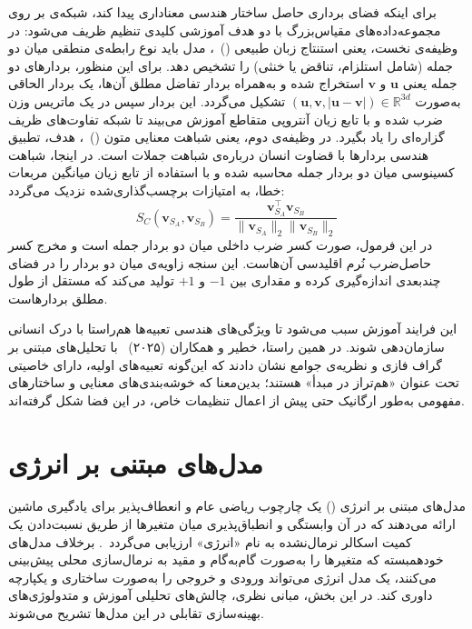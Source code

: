 برای اینکه فضای برداری حاصل ساختار هندسی معناداری پیدا کند، شبکه‌ی  بر روی مجموعه‌داده‌های مقیاس‌بزرگ با دو هدف آموزشی کلیدی تنظیم ظریف می‌شود: در وظیفه‌ی نخست، یعنی استنتاج زبان طبیعی ()~\cite{bowman2015large, williams2018broad}، مدل باید نوع رابطه‌ی منطقی میان دو جمله (شامل استلزام، تناقض یا خنثی) را تشخیص دهد. برای این منظور، بردارهای دو جمله یعنی $\mathbf{u}$ و $\mathbf{v}$ استخراج شده و به‌همراه بردار تفاضل مطلق آن‌ها، یک بردار الحاقی به‌صورت $(\mathbf{u}, \mathbf{v}, |\mathbf{u} - \mathbf{v}|) \in \mathbb{R}^{3d}$ تشکیل می‌گردد. این بردار سپس در یک ماتریس وزن ضرب شده و با تابع زیان آنتروپی متقاطع آموزش می‌بیند تا شبکه تفاوت‌های ظریف گزاره‌ای را یاد بگیرد. در وظیفه‌ی دوم، یعنی شباهت معنایی متون ()~\cite{cer2017semeval}، هدف، تطبیق هندسی بردارها با قضاوت انسان درباره‌ی شباهت جملات است. در اینجا، شباهت کسینوسی میان دو بردار جمله محاسبه شده و با استفاده از تابع زیان میانگین مربعات خطا، به امتیازات برچسب‌گذاری‌شده نزدیک می‌گردد:
\begin{equation}\label{eq:chap2_cosine_sim}
    S_C(\mathbf{v}_{S_A}, \mathbf{v}_{S_B}) = \frac{\mathbf{v}_{S_A}^\top \mathbf{v}_{S_B}}{\|\mathbf{v}_{S_A}\|_2 \|\mathbf{v}_{S_B}\|_2}
\end{equation}
در این فرمول، صورت کسر ضرب داخلی میان دو بردار جمله است و مخرج کسر حاصل‌ضرب نُرم اقلیدسی آن‌هاست. این سنجه زاویه‌ی میان دو بردار را در فضای چندبعدی اندازه‌گیری کرده و مقداری بین $-1$ و $+1$ تولید می‌کند که مستقل از طول مطلق بردارهاست.

این فرایند آموزش سبب می‌شود تا ویژگی‌های هندسی تعبیه‌ها هم‌راستا با درک انسانی سازمان‌دهی شوند. در همین راستا، خطیر و همکاران (۲۰۲۵)~\cite{khatir2025aligned} با تحلیل‌های مبتنی بر گراف فازی و نظریه‌ی جوامع نشان دادند که این‌گونه تعبیه‌های اولیه، دارای خاصیتی تحت عنوان «هم‌تراز در مبدأ» هستند؛ بدین‌معنا که خوشه‌بندی‌های معنایی و ساختارهای مفهومی به‌طور ارگانیک حتی پیش از اعمال تنظیمات خاص، در این فضا شکل گرفته‌اند.



\section{مدل‌های مبتنی بر انرژی}\label{sec:2-4}

مدل‌های مبتنی بر انرژی () یک چارچوب ریاضی عام و انعطاف‌پذیر برای یادگیری ماشین ارائه می‌دهند که در آن وابستگی و انطباق‌پذیری میان متغیرها از طریق نسبت‌دادن یک کمیت اسکالر نرمال‌نشده به نام «انرژی» ارزیابی می‌گردد~\cite{lecun2006tutorial}. برخلاف مدل‌های خودهمبسته که متغیرها را به‌صورت گام‌به‌گام و مقید به نرمال‌سازی محلی پیش‌بینی می‌کنند، یک مدل انرژی می‌تواند ورودی و خروجی را به‌صورت ساختاری و یکپارچه داوری کند. در این بخش، مبانی نظری، چالش‌های تحلیلی آموزش و متدولوژی‌های بهینه‌سازی تقابلی در این مدل‌ها تشریح می‌شوند.


